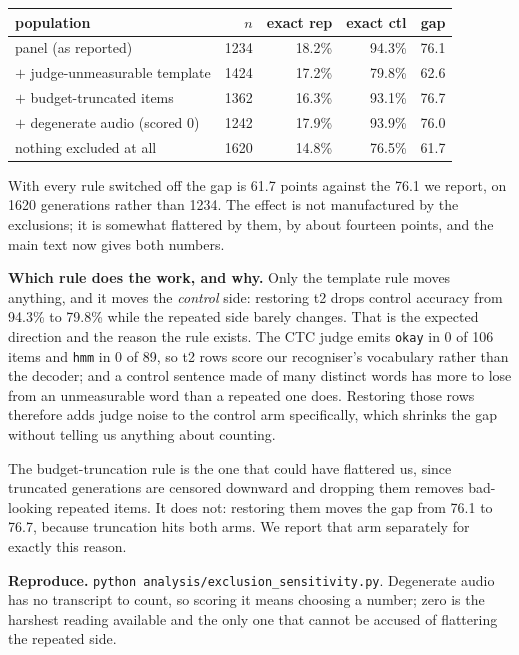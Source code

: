\documentclass[11pt]{article}
\begin{document}
\begin{center}
\begin{tabular}{lrrrr}
\toprule
population & $n$ & exact rep & exact ctl & gap \\
\midrule
panel (as reported)   & 1234 & 18.2\% & 94.3\% & 76.1 \\
$+$ judge-unmeasurable template & 1424 & 17.2\% & 79.8\% & 62.6 \\
$+$ budget-truncated items & 1362 & 16.3\% & 93.1\% & 76.7 \\
$+$ degenerate audio (scored 0) & 1242 & 17.9\% & 93.9\% & 76.0 \\
nothing excluded at all & 1620 & 14.8\% & 76.5\% & 61.7 \\
\bottomrule
\end{tabular}
\end{center}

\noindent With every rule switched off the gap is 61.7 points against the 76.1
we report, on 1620 generations rather than 1234. The effect is not manufactured
by the exclusions; it is somewhat flattered by them, by about fourteen points,
and the main text now gives both numbers.

\noindent\textbf{Which rule does the work, and why.} Only the template rule moves
anything, and it moves the \emph{control} side: restoring t2 drops control
accuracy from 94.3\% to 79.8\% while the repeated side barely changes. That is
the expected direction and the reason the rule exists. The CTC judge emits
\texttt{okay} in 0 of 106 items and \texttt{hmm} in 0 of 89, so t2 rows score our
recogniser's vocabulary rather than the decoder; and a control sentence made
of many distinct words has more to lose from an unmeasurable word than a repeated
one does. Restoring those rows therefore adds judge noise to the control arm
specifically, which shrinks the gap without telling us anything about counting.

The budget-truncation rule is the one that could have flattered us, since
truncated generations are censored downward and dropping them removes bad-looking
repeated items. It does not: restoring them moves the gap from 76.1 to 76.7,
because truncation hits both arms. We report that arm separately for exactly this
reason.

\noindent\textbf{Reproduce.} \texttt{python analysis/exclusion\_sensitivity.py}.
Degenerate audio has no transcript to count, so scoring it means choosing a
number; zero is the harshest reading available and the only one that cannot be
accused of flattering the repeated side.
\end{document}
